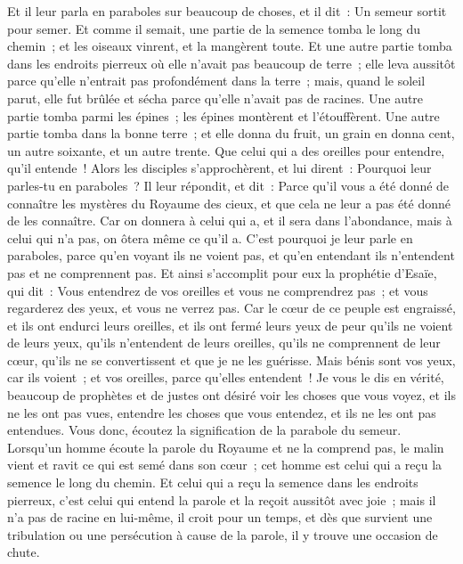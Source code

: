\begin{multicols}{2}
Et il leur parla en paraboles sur beaucoup de choses, et il dit~: Un semeur sortit pour semer.
Et comme il semait, une partie de la semence tomba le long du chemin~; et les oiseaux vinrent, et la mangèrent toute.
Et une autre partie tomba dans les endroits pierreux où elle n'avait pas beaucoup de terre~; elle leva aussitôt parce qu'elle n'entrait pas profondément dans la terre~;
mais, quand le soleil parut, elle fut brûlée et sécha parce qu'elle n'avait pas de racines.
Une autre partie tomba parmi les épines~; les épines montèrent et l'étouffèrent.
Une autre partie tomba dans la bonne terre~; et elle donna du fruit, un grain en donna cent, un autre soixante, et un autre trente.
Que celui qui a des oreilles pour entendre, qu'il entende~!
Alors les disciples s'approchèrent, et lui dirent~: Pourquoi leur parles-tu en paraboles~?
Il leur répondit, et dit~: Parce qu'il vous a été donné de connaître les mystères du Royaume des cieux, et que cela ne leur a pas été donné de les connaître.
Car on donnera à celui qui a, et il sera dans l'abondance, mais à celui qui n'a pas, on ôtera même ce qu'il a.
C'est pourquoi je leur parle en paraboles, parce qu'en voyant ils ne voient pas, et qu'en entendant ils n'entendent pas et ne comprennent pas.
Et ainsi s'accomplit pour eux la prophétie d'Esaïe, qui dit~: Vous entendrez de vos oreilles et vous ne comprendrez pas~; et vous regarderez des yeux, et vous ne verrez pas.
Car le cœur de ce peuple est engraissé, et ils ont endurci leurs oreilles, et ils ont fermé leurs yeux de peur qu'ils ne voient de leurs yeux, qu'ils n'entendent de leurs oreilles, qu'ils ne comprennent de leur cœur, qu'ils ne se convertissent et que je ne les guérisse.
Mais bénis sont vos yeux, car ils voient~; et vos oreilles, parce qu'elles entendent~!
Je vous le dis en vérité, beaucoup de prophètes et de justes ont désiré voir les choses que vous voyez, et ils ne les ont pas vues, entendre les choses que vous entendez, et ils ne les ont pas entendues.
Vous donc, écoutez la signification de la parabole du semeur.
Lorsqu'un homme écoute la parole du Royaume et ne la comprend pas, le malin vient et ravit ce qui est semé dans son cœur~; cet homme est celui qui a reçu la semence le long du chemin.
Et celui qui a reçu la semence dans les endroits pierreux, c'est celui qui entend la parole et la reçoit aussitôt avec joie~;
mais il n'a pas de racine en lui-même, il croit pour un temps, et dès que survient une tribulation ou une persécution à cause de la parole, il y trouve une occasion de chute.

\end{multicols}
